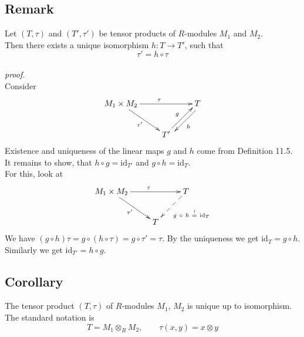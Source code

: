 \documentclass[12pt]{book}
\begin{document}
\begin{spacing}{1.3}
\subsection{Remark}%
Let $(T,\tau)$ and $(T', \tau')$ be tensor products of $R$-modules $M_1$ and $M_2$.\\
Then there exists a unique isomorphism
$h: T \longrightarrow T'$, such that $$\tau'=h \circ \tau$$
\pagebreak\\
\textit{proof.}\\
Consider
$$\begin{xy}?
\xymatrix{
**[c] M_1 \times M_2 \ar[rr]^{\tau} \ar[rd]_{\tau'} && T \ar@<4pt> [ld]^{h}  \\ & T'  \ar@<1pt>[ru]^g&
}
\end{xy}$$
Existence and uniqueness of the linear maps $g$ and $h$ come from Definition 11.5. It remains to show, that $h \circ g = \textrm{id}_{T'}$ and $g \circ h = \textrm{id}_{T}$.\\
For this, look at 
$$\begin{xy}
\xymatrix{
M_1 \times M_2 \ar[rr]^{\tau} \ar[rd]_{\tau'} && T \ar@{-->}[ld]^{g\ \circ \ h\ \overset{!}{=}\ \textrm{id}_T} \\ & T &
}
\end{xy}$$
We have $(g \circ h) \tau = g \circ ( h \circ \tau )= g \circ \tau'=\tau$. By the uniqueness we get $\textrm{id}_{T}=g \circ h $.
\\Similarly we get $\textrm{id}_{T'}= h \circ g$.\\

\subsection{Corollary}%
The tensor product $(T, \tau)$ of $R$-modules $M_1$, $M_2$ is unique up to isomorphism. The standard notation is
$$T= M_1 \otimes_R M_2, \qquad \tau(x,y)=x \otimes y$$


\end{spacing}
\end{document}
